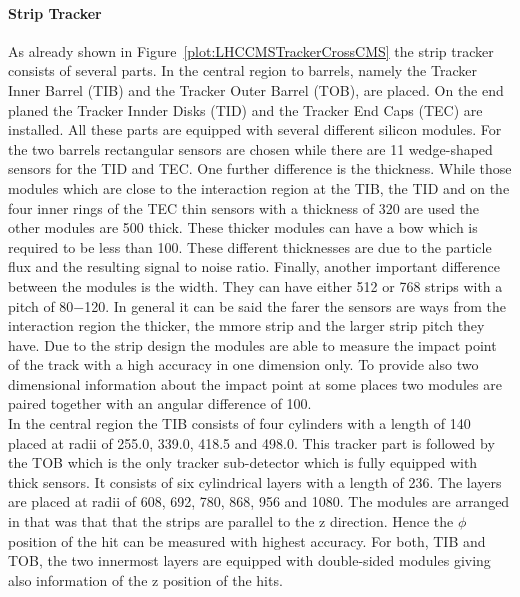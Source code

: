 \paragraph{Strip Tracker}
As already shown in Figure~\ref{plot:LHCCMSTrackerCrossCMS} the strip tracker consists of several parts. In the central region to barrels, namely the Tracker Inner Barrel (TIB) and the Tracker Outer Barrel (TOB), are placed. On the end planed the Tracker Innder Disks (TID) and the Tracker End Caps (TEC) are installed. All these parts are equipped with several different silicon modules. For the two barrels rectangular sensors are chosen while there are 11 wedge-shaped sensors for the TID and TEC. One further difference is the thickness. While those modules which are close to the interaction region at the TIB, the TID and on the four inner rings of the TEC thin sensors with a thickness of 320\mum{} are used the other modules are 500\mum{} thick. These thicker modules can have a bow which is required to be less than 100\mum{}. These different thicknesses are due to the particle flux and the resulting signal to noise ratio. Finally, another important difference between the modules is the width. They can have either 512 or 768 strips with a pitch of 80$-$120\mum{}. In general it can be said the farer the sensors are ways from the interaction region the thicker, the mmore strip and the larger strip pitch they have. Due to the strip design the modules are able to measure the impact point of the track with a high accuracy in one dimension only. To provide also two dimensional information about the impact point at some places two modules are paired together with an angular difference of 100\mrad{}.\\
In the central region the TIB consists of four cylinders with a length of 140\cm{} placed at radii of 255.0, 339.0, 418.5 and 498.0\mm{}. This tracker part is followed by the TOB which is the only tracker sub-detector which is fully equipped with thick sensors. It consists of six cylindrical layers with a length of 236\cm{}. The layers are placed at radii of 608, 692, 780, 868, 956 and 1080\mm{}. The modules are arranged in that was that that the strips are parallel to the z direction. Hence the $\phi{}$ position of the hit can be measured with highest accuracy. For both, TIB and TOB, the two innermost layers are equipped with double-sided modules giving also information of the z position of the hits.\\
